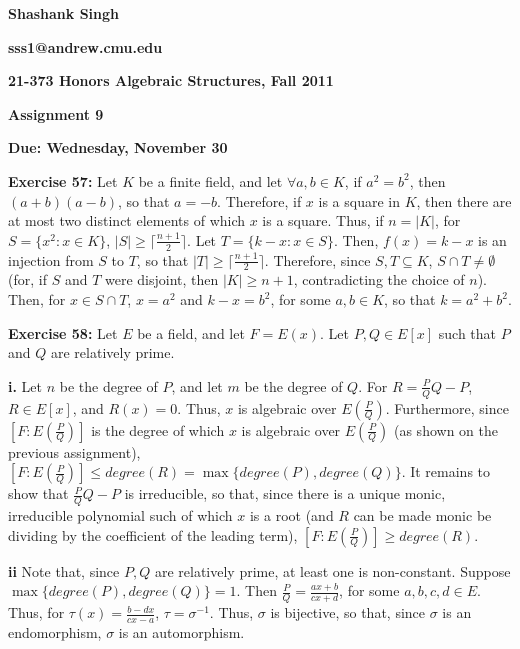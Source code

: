 \documentclass{article}%
\begin{document}
\begin{center}
\textbf{Shashank Singh}

\textbf{sss1@andrew.cmu.edu}

\textbf{21-373 \quad Honors Algebraic Structures, Fall 2011}

\textbf{Assignment 9}

\textbf{Due: Wednesday, November 30}\\
\end{center}

\textbf{Exercise 57:} Let $K$ be a finite field, and let $\forall a,b \in K$, if
$a^2 = b^2$, then $(a + b)(a - b)$, so that $a = -b$. Therefore, if $x$ is a
square in $K$, then there are at most two distinct elements of which $x$ is a
square. Thus, if $n = |K|$, for $S = \{x^2 : x \in K\}$, $|S| \geq
 \lceil \frac{n + 1}{2} \rceil$. Let $T = \{k - x : x \in S\}$. Then,
$f(x) = k - x$ is an injection from $S$ to $T$, so that
$|T| \geq \lceil \frac{n + 1}{2} \rceil$.
Therefore, since $S, T \subseteq K$, $S \cap T \neq \emptyset$ (for, if $S$
and $T$ were disjoint, then $|K| \geq n + 1$, contradicting the choice of
$n$). Then, for $x \in S \cap T$, $x = a^2$ and $k - x = b^2$, for some
$a,b \in K$, so that $k = a^2 + b^2$.

\textbf{Exercise 58:} Let $E$ be a field, and let $F = E(x)$. Let $P,Q \in
E[x]$ such that $P$ and $Q$ are relatively prime.

\textbf{i.} Let $n$ be the degree of $P$, and let $m$ be the degree of $Q$.
For $R = \frac{P}{Q} Q - P$, $R \in E[x]$, and $R(x) = 0$. Thus, $x$ is
algebraic over $E(\frac{P}{Q})$. Furthermore, since $[F : E(\frac{P}{Q})]$ is
the degree of which $x$ is algebraic over $E(\frac{P}{Q})$ (as shown on the
previous assignment), $[F : E(\frac{P}{Q})] \leq degree(R) = \max\{degree(P),
degree(Q)\}$. It remains to show that $\frac{P}{Q} Q - P$ is irreducible, so
that, since there is a unique monic, irreducible polynomial such of which $x$
is a root (and $R$ can be made monic be dividing by the coefficient of the
leading term), $[F : E(\frac{P}{Q})] \geq degree(R)$.

\textbf{ii} Note that, since $P,Q$ are relatively prime, at least one is
non-constant.
Suppose $\max\{degree(P),degree(Q)\} = 1$. Then $\frac{P}{Q} =
\frac{ax + b}{cx + d}$, for some $a,b,c,d \in E$. Thus, for
$\tau(x) = \frac{b - dx}{cx - a}$, $\tau = \sigma^{-1}$. Thus, $\sigma$ is
bijective, so that, since $\sigma$ is an endomorphism, $\sigma$ is an
automorphism.
\end{document}
